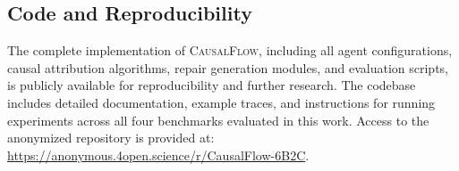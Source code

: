 \documentclass{article}
\theoremstyle{plain}
\theoremstyle{definition}
\theoremstyle{remark}
\begin{document}
\subsection{Code and Reproducibility}

The complete implementation of \textsc{CausalFlow}, including all agent configurations, causal attribution algorithms, repair generation modules, and evaluation scripts, is publicly available for reproducibility and further research. The codebase includes detailed documentation, example traces, and instructions for running experiments across all four benchmarks evaluated in this work. Access to the anonymized repository is provided at: \url{https://anonymous.4open.science/r/CausalFlow-6B2C}.
\end{document}
